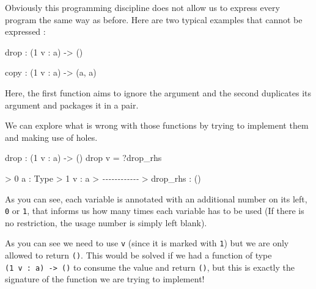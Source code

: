\documentclass[
]{article}
\newenvironment{Shaded}{}{}
\newcommand{\CommentTok}[1]{\textcolor[rgb]{0.38,0.63,0.69}{\textit{#1}}}
\newcommand{\DataTypeTok}[1]{\textcolor[rgb]{0.56,0.13,0.00}{#1}}
\newcommand{\DecValTok}[1]{\textcolor[rgb]{0.25,0.63,0.44}{#1}}
\newcommand{\FunctionTok}[1]{\textcolor[rgb]{0.02,0.16,0.49}{#1}}
\newcommand{\NormalTok}[1]{#1}
\newcommand{\OperatorTok}[1]{\textcolor[rgb]{0.40,0.40,0.40}{#1}}
\newcommand{\OtherTok}[1]{\textcolor[rgb]{0.00,0.44,0.13}{#1}}
\begin{document}
Obviously this programming discipline does not allow us to express every
program the same way as before. Here are two typical examples that
cannot be expressed :

\begin{Shaded}
\begin{Highlighting}[]
\FunctionTok{drop} \OperatorTok{:}\NormalTok{ (}\DecValTok{1}\NormalTok{ v }\OperatorTok{:}\NormalTok{ a) }\OtherTok{{-}\textgreater{}}\NormalTok{ ()}

\NormalTok{copy }\OperatorTok{:}\NormalTok{ (}\DecValTok{1}\NormalTok{ v }\OperatorTok{:}\NormalTok{ a) }\OtherTok{{-}\textgreater{}}\NormalTok{ (a, a)}
\end{Highlighting}
\end{Shaded}

Here, the first function aims to ignore the argument and the second
duplicates its argument and packages it in a pair.

We can explore what is wrong with those functions by trying to implement
them and making use of holes.

\begin{Shaded}
\begin{Highlighting}[]
\FunctionTok{drop} \OperatorTok{:}\NormalTok{ (}\DecValTok{1}\NormalTok{ v }\OperatorTok{:}\NormalTok{ a) }\OtherTok{{-}\textgreater{}}\NormalTok{ ()}
\FunctionTok{drop}\NormalTok{ v }\OtherTok{=} \OperatorTok{?}\NormalTok{drop\_rhs}
\end{Highlighting}
\end{Shaded}

\begin{Shaded}
\begin{Highlighting}[]
\OperatorTok{\textgreater{}} \DecValTok{0}\NormalTok{ a }\OperatorTok{:} \DataTypeTok{Type}
\OperatorTok{\textgreater{}} \DecValTok{1}\NormalTok{ v }\OperatorTok{:}\NormalTok{ a}
\OperatorTok{\textgreater{}} \CommentTok{{-}{-}{-}{-}{-}{-}{-}{-}{-}{-}{-}{-}}
\OperatorTok{\textgreater{}}\NormalTok{ drop\_rhs }\OperatorTok{:}\NormalTok{ ()}
\end{Highlighting}
\end{Shaded}

As you can see, each variable is annotated with an additional number on
its left, \texttt{0} or \texttt{1}, that informs us how many times each
variable has to be used (If there is no restriction, the usage number is
simply left blank).

As you can see we need to use \texttt{v} (since it is marked with
\texttt{1}) but we are only allowed to return \texttt{()}. This would be
solved if we had a function of type
\texttt{(1\ v\ :\ a)\ -\textgreater{}\ ()} to consume the value and
return \texttt{()}, but this is exactly the signature of the function we
are trying to implement!
\end{document}

